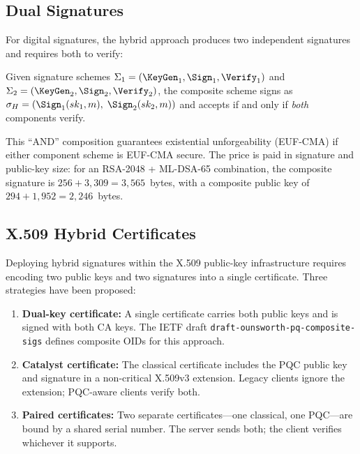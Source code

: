 \subsection{Dual Signatures}
\label{subsec:dual-signatures}

For digital signatures, the hybrid approach produces two independent signatures and requires both to verify:

\begin{definition}
\label{def:composite-sig}
Given signature schemes $\Sigma_1 = (\KeyGen_1, \Sign_1, \Verify_1)$ and $\Sigma_2 = (\KeyGen_2, \Sign_2, \Verify_2)$, the composite scheme signs as $\sigma_H = (\Sign_1(sk_1, m),\; \Sign_2(sk_2, m))$ and accepts if and only if \emph{both} components verify.
\end{definition}

This ``AND'' composition guarantees existential unforgeability (EUF-CMA) if either component scheme is EUF-CMA secure.  The price is paid in signature and public-key size: for an RSA-2048 + ML-DSA-65 combination, the composite signature is $256 + 3{,}309 = 3{,}565$~bytes, with a composite public key of $294 + 1{,}952 = 2{,}246$~bytes.


\subsection{X.509 Hybrid Certificates}
\label{subsec:x509-hybrid}

Deploying hybrid signatures within the X.509 public-key infrastructure requires encoding two public keys and two signatures into a single certificate.  Three strategies have been proposed:

\begin{enumerate}
\item \textbf{Dual-key certificate:} A single certificate carries both public keys and is signed with both CA keys.  The IETF draft \texttt{draft-ounsworth-pq-composite-sigs} defines composite OIDs for this approach.
\item \textbf{Catalyst certificate:} The classical certificate includes the PQC public key and signature in a non-critical X.509v3 extension.  Legacy clients ignore the extension; PQC-aware clients verify both.
\item \textbf{Paired certificates:} Two separate certificates---one classical, one PQC---are bound by a shared serial number.  The server sends both; the client verifies whichever it supports.
\end{enumerate}

